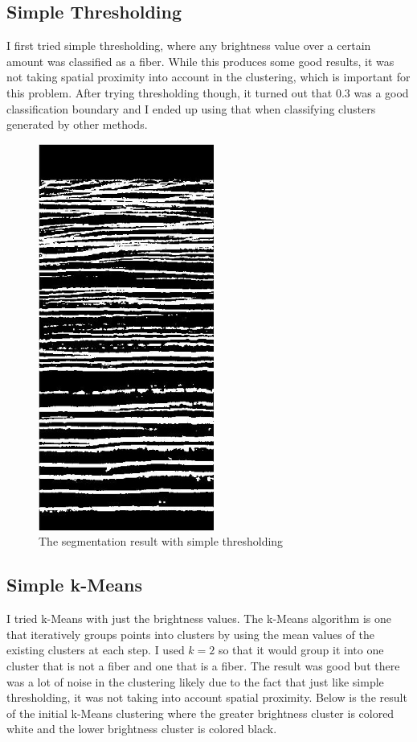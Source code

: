 \documentclass[11pt,psfig]{article}
\begin{document}
\subsection{Simple Thresholding}
I first tried simple thresholding, where any brightness value over a certain amount was classified as a fiber. While this produces some good results, it was not taking spatial proximity into account in the clustering, which is important for this problem. After trying thresholding though, it turned out that $0.3$ was a good classification boundary and I ended up using that when classifying clusters generated by other methods. \\
\begin{figure}[H]
\centering
\includegraphics[height=5in]{thresholdSegmentationResult.jpg}
\caption{The segmentation result with simple thresholding}
\end{figure}

\subsection{Simple k-Means}
I tried k-Means with just the brightness values. The k-Means algorithm is one that iteratively groups points into clusters by using the mean values of the existing clusters at each step. I used $k=2$ so that it would group it into one cluster that is not a fiber and one that is a fiber. The result was good but there was a lot of noise in the clustering likely due to the fact that just like simple thresholding, it was not taking into account spatial proximity. Below is the result of the initial k-Means clustering where the greater brightness cluster is colored white and the lower brightness cluster is colored black. 
\end{document}
